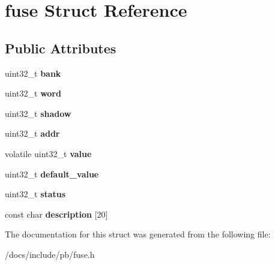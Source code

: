 \hypertarget{structfuse}{}\section{fuse Struct Reference}
\label{structfuse}
\subsection*{Public Attributes}
\begin{DoxyCompactItemize}
\item 
\mbox{\label{structfuse_ad242b99d53c8225d2af697f681c7ee15}} 
uint32\+\_\+t {\bfseries bank}
\item 
\mbox{\label{structfuse_a8b24717adb9c006992cc8faec275d449}} 
uint32\+\_\+t {\bfseries word}
\item 
\mbox{\label{structfuse_a7eba052d76a6c3b8e9a61a7b8a723249}} 
uint32\+\_\+t {\bfseries shadow}
\item 
\mbox{\label{structfuse_a6915d0773b606b1ddf03bb30029288a3}} 
uint32\+\_\+t {\bfseries addr}
\item 
\mbox{\label{structfuse_a9db2f4d2a8b6961492e78836fb22a07d}} 
volatile uint32\+\_\+t {\bfseries value}
\item 
\mbox{\label{structfuse_a16eb2f78c923ff2dcf6f815f9a8c69ce}} 
uint32\+\_\+t {\bfseries default\+\_\+value}
\item 
\mbox{\label{structfuse_af74bba2e296898d01fb1bb7a52964e37}} 
uint32\+\_\+t {\bfseries status}
\item 
\mbox{\label{structfuse_a0bddd65ed058fc0ab82bcfeb0e8b9a29}} 
const char {\bfseries description} \mbox{[}20\mbox{]}
\end{DoxyCompactItemize}


The documentation for this struct was generated from the following file\+:\begin{DoxyCompactItemize}
\item 
/docs/include/pb/fuse.\+h\end{DoxyCompactItemize}

